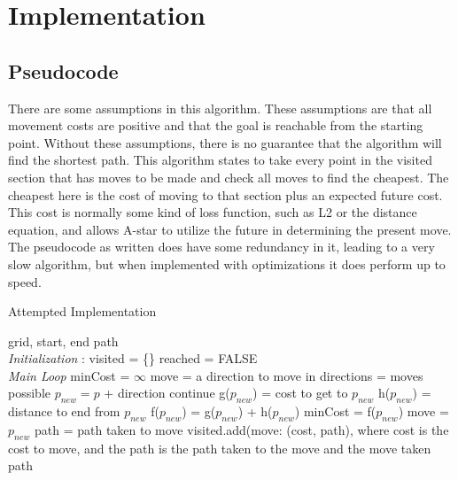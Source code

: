 \documentclass[letterpaper, 10 pt, conference]{ieeeconf}   %
\begin{document}
\section{Implementation}

\subsection{Pseudocode}
There are some assumptions in this algorithm. These assumptions are that all movement costs are positive and that the goal is reachable from the starting point. Without these assumptions, there is no guarantee that the algorithm will find the shortest path.
This algorithm states to take every point in the visited section that has moves to be made and check all moves to find the cheapest. The cheapest here is the cost of moving to that section plus an expected future cost. This cost is normally some kind of loss function, such as L2 or the distance equation, and allows A-star to utilize the future in determining the present move. The pseudocode as written does have some redundancy in it, leading to a very slow algorithm, but when implemented with optimizations it does perform up to speed.
\begin{algorithm}[H]
	\caption{Attempted Implementation}
	\begin{algorithmic}[1]
		\renewcommand{\algorithmicrequire}{\textbf{Input:}}
		\renewcommand{\algorithmicensure}{\textbf{Output:}}
		\REQUIRE grid, start, end
		\ENSURE  path
		\\ \textit{Initialization} :
		\STATE  visited = \{\}
		\STATE reached = FALSE
		\\ \textit{Main Loop}
		\STATE minCost = $\infty$
		\STATE move = a direction to move in
		\STATE directions = moves possible
		\STATE $p_{new} = p$ + direction
		\STATE continue
		\ENDIF
		\STATE g($p_{new}$) = cost to get to $p_{new}$
		\STATE h($p_{new}$) = distance to end from $p_{new}$
		\STATE f($p_{new}$) = g($p_{new}$) + h($p_{new}$)
		\STATE minCost = f($p_{new}$)
		\STATE move = $p_{new}$
		\ENDIF
		\ENDFOR
		\ENDFOR
		\RETURN path = path taken to move
		\ENDIF
		\STATE visited.add(move: (cost, path), where cost is the cost to move, and the path is the path taken to the move and the move taken
		\ENDWHILE
		\RETURN path
	\end{algorithmic}
\end{algorithm}
\end{document}
